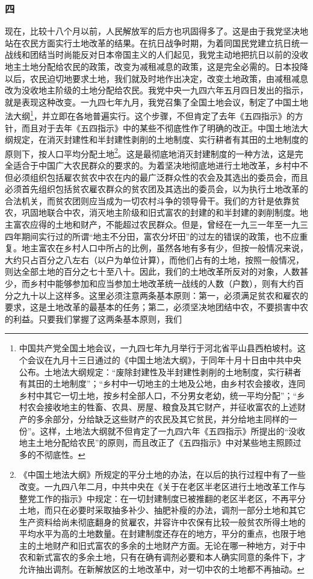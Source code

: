 \documentclass[cn,11pt,chinese]{elegantbook}
\def\myformat#1{\hfil\hfil #1}
\begin{document}
\subsubsection*{\myformat{四}}
现在，比较十八个月以前，人民解放军的后方也巩固得多了。这是由于我党坚决地站在农民方面实行土地改革的结果。在抗日战争时期，为着同国民党建立抗日统一战线和团结当时尚能反对日本帝国主义的人们起见，我党主动地把抗日以前的没收地主土地分配给农民的政策，改变为减租减息的政策，这是完全必需的。日本投降以后，农民迫切地要求土地，我们就及时地作出决定，改变土地政策，由减租减息改为没收地主阶级的土地分配给农民。我党中央一九四六年五月四日发出的指示，就是表现这种改变。一九四七年九月，我党召集了全国土地会议，制定了中国土地法大纲\footnote[7]{ 中国共产党全国土地会议，一九四七年九月举行于河北省平山县西柏坡村。这个会议在九月十三日通过的《中国土地法大纲》，于同年十月十日由中共中央公布。土地法大纲规定：“废除封建性及半封建性剥削的土地制度，实行耕者有其田的土地制度”；“乡村中一切地主的土地及公地，由乡村农会接收，连同乡村中其它一切土地，按乡村全部人口，不分男女老幼，统一平均分配”；“乡村农会接收地主的牲畜、农具、房屋、粮食及其它财产，并征收富农的上述财产的多余部分，分给缺乏这些财产的农民及其它贫民，并分给地主同样的一份”。这样，土地法大纲就不但肯定了一九四六年《五四指示》所提出的“没收地主土地分配给农民”的原则，而且改正了《五四指示》中对某些地主照顾过多的不彻底性。}，并立即在各地普遍实行。这个步骤，不但肯定了去年《五四指示》的方针，而且对于去年《五四指示》中的某些不彻底性作了明确的改正。中国土地法大纲规定，在消灭封建性和半封建性剥削的土地制度、实行耕者有其田的土地制度的原则下，按人口平均分配土地\footnote[8]{ 《中国土地法大纲》所规定的平分土地的办法，在以后的执行过程中有了一些改变。一九四八年二月，中共中央在《关于在老区半老区进行土地改革工作与整党工作的指示》中规定：在一切封建制度已被推翻的老区半老区，不再平分土地，而只在必要时采取抽多补少、抽肥补瘦的办法，调剂一部分土地和其它生产资料给尚未彻底翻身的贫雇农，并容许中农保有比较一般贫农所得土地的平均水平为高的土地数量。在封建制度还存在的地方，平分的重点，也限于地主的土地财产和旧式富农的多余的土地财产方面。无论在哪一种地方，对于中农和新式富农的多余土地，只有在确有调剂必要和本人确实同意的条件下，才允许抽出调剂。在新解放区的土地改革中，对一切中农的土地都不再抽动。}。这是最彻底地消灭封建制度的一种方法，这是完全适合于中国广大农民群众的要求的。为着坚决地彻底地进行土地改革，乡村中不但必须组织包括雇农贫农中农在内的最广泛群众性的农会及其选出的委员会，而且必须首先组织包括贫农雇农群众的贫农团及其选出的委员会，以为执行土地改革的合法机关，而贫农团则应当成为一切农村斗争的领导骨干。我们的方针是依靠贫农，巩固地联合中农，消灭地主阶级和旧式富农的封建的和半封建的剥削制度。地主富农应得的土地和财产，不能超过农民群众。但是，曾经在一九三一年至一九三四年期间实行过的所谓“地主不分田，富农分坏田”的过左的错误的政策，也不应重复。地主富农在乡村人口中所占的比例，虽然各地有多有少，但按一般情况来说，大约只占百分之八左右（以户为单位计算），而他们占有的土地，按照一般情况，则达全部土地的百分之七十至八十。因此，我们的土地改革所反对的对象，人数甚少，而乡村中能够参加和应当参加土地改革统一战线的人数（户数），则有大约百分之九十以上这样多。这里必须注意两条基本原则：第一，必须满足贫农和雇农的要求，这是土地改革的最基本的任务；第二，必须坚决地团结中农，不要损害中农的利益。只要我们掌握了这两条基本原则，我们
\end{document}
